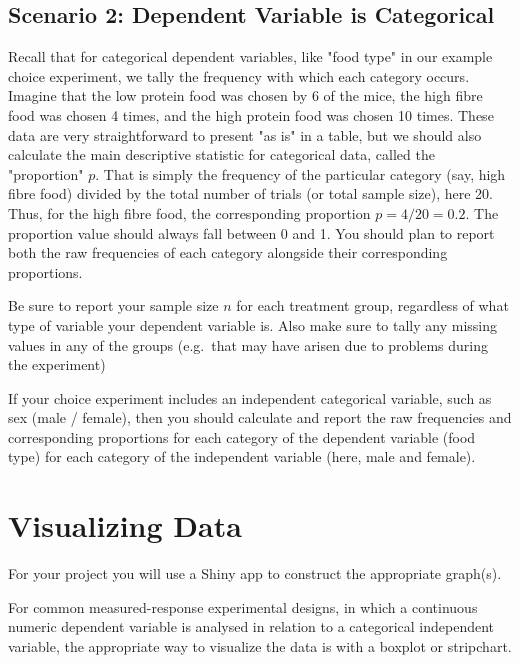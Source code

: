 \documentclass[
]{book}
\begin{document}
\hypertarget{scenario-2-dependent-variable-is-categorical}{%
\subsection*{Scenario 2: Dependent Variable is Categorical}\label{scenario-2-dependent-variable-is-categorical}}

Recall that for categorical dependent variables, like "food type" in our example choice experiment, we tally the frequency with which each category occurs. Imagine that the low protein food was chosen by 6 of the mice, the high fibre food was chosen 4 times, and the high protein food was chosen 10 times. These data are very straightforward to present "as is" in a table, but we should also calculate the main descriptive statistic for categorical data, called the "proportion" \(p\). That is simply the frequency of the particular category (say, high fibre food) divided by the total number of trials (or total sample size), here 20. Thus, for the high fibre food, the corresponding proportion \(p = 4/20 = 0.2\). The proportion value should always fall between 0 and 1. You should plan to report both the raw frequencies of each category alongside their corresponding proportions.

Be sure to report your sample size \(n\) for each treatment group, regardless of what type of variable your dependent variable is. Also make sure to tally any missing values in any of the groups (e.g.~that may have arisen due to problems during the experiment)

If your choice experiment includes an independent categorical variable, such as sex (male / female), then you should calculate and report the raw frequencies and corresponding proportions for each category of the dependent variable (food type) for each category of the independent variable (here, male and female).

\hypertarget{visualizing-data}{%
\section*{Visualizing Data}\label{visualizing-data}}

For your project you will use a Shiny app to construct the appropriate graph(s).

For common measured-response experimental designs, in which a continuous numeric dependent variable is analysed in relation to a categorical independent variable, the appropriate way to visualize the data is with a boxplot or stripchart.
\end{document}
